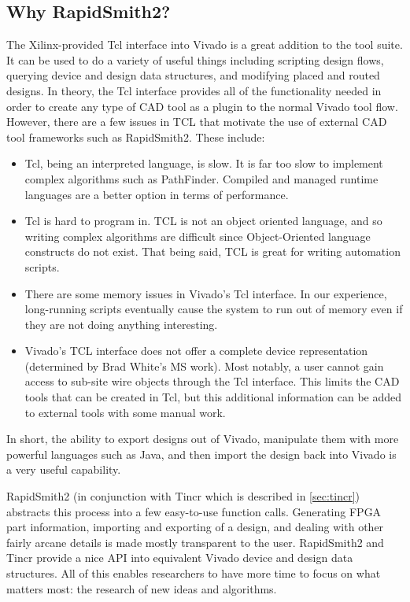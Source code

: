 \subsection{Why RapidSmith2?}
The Xilinx-provided Tcl interface into Vivado is a great addition to the tool
suite. It can be used to do a variety of useful things including scripting
design flows, querying device and design data structures, and  modifying placed
and routed designs. In theory, the Tcl interface provides all of the
functionality needed in order to create any type of CAD tool as a plugin to the
normal Vivado tool flow. However, there are a few issues in TCL that motivate
the use of external CAD tool frameworks such as RapidSmith2. These include:
\begin{itemize}
  \item Tcl, being an interpreted language, is slow. It is far too slow to
  implement complex algorithms such as PathFinder. Compiled and
  managed runtime languages are a better option in terms of performance.
  \item Tcl is hard to program in. TCL is not an object oriented language, and
  so writing complex algorithms are difficult since Object-Oriented language
  constructs do not exist. That being said, TCL is great for writing automation
  scripts.
  \item There are some memory issues in Vivado's Tcl interface. In our
  experience, long-running scripts eventually cause the system to run out of
  memory even if they are not doing anything interesting.
  \item Vivado's TCL interface does not offer a complete device representation
  (determined by Brad White's MS work). Most notably, a user cannot gain
  access to sub-site wire objects through the Tcl interface. This limits the CAD
  tools that can be created in Tcl, but this additional information can be added
  to external tools with some manual work.
\end{itemize}

\noindent
In short, the ability to export designs out of Vivado, manipulate them with more
powerful languages such as Java, and then import the design back into Vivado
is a very useful capability.

RapidSmith2 (in conjunction with Tincr which is described in \autoref{sec:tincr})
abstracts this process into a few easy-to-use function calls. Generating FPGA
part information, importing and exporting  of a design, and
dealing with other fairly arcane details is made mostly transparent to the
user. RapidSmith2 and Tincr provide a nice API into equivalent Vivado device and design
data structures. All of this enables researchers to have more time to focus on what matters
most: the research of new ideas and algorithms.

